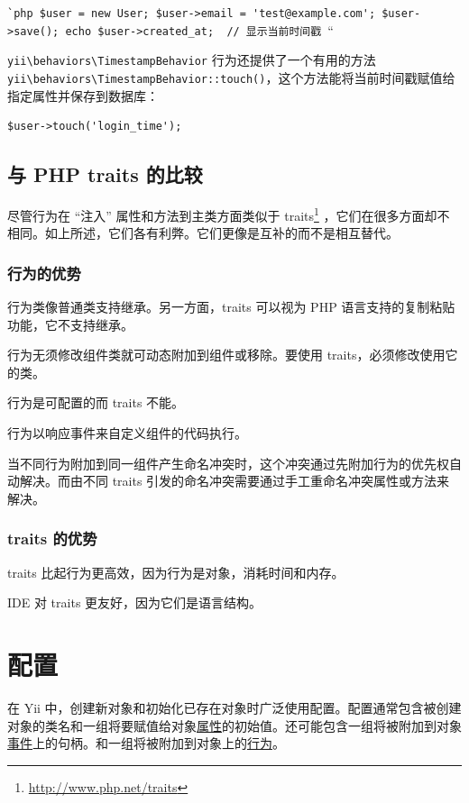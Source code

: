 \lstinline|`php $user = new User; $user->email = 'test@example.com'; $user->save(); echo $user->created_at;  // 显示当前时间戳 |``

\texttt{yii{\allowbreak{}\textbackslash}behaviors{\allowbreak{}\textbackslash}TimestampBehavior} 行为还提供了一个有用的方法 \texttt{yii{\allowbreak{}\textbackslash}behaviors{\allowbreak{}\textbackslash}TimestampBehavior\allowbreak{}::\allowbreak{}touch()}，这个方法能将当前时间戳赋值给指定属性并保存到数据库：

\lstset{language=php}\begin{lstlisting}
$user->touch('login_time');
\end{lstlisting}
\subsection{与 PHP traits 的比较}
尽管行为在 ``注入'' 属性和方法到主类方面类似于 traits\footnote{\url{http://www.php.net/traits}} ，它们在很多方面却不相同。如上所述，它们各有利弊。它们更像是互补的而不是相互替代。

\subsubsection{行为的优势}
行为类像普通类支持继承。另一方面，traits 可以视为 PHP 语言支持的复制粘贴功能，它不支持继承。

行为无须修改组件类就可动态附加到组件或移除。要使用 traits，必须修改使用它的类。

行为是可配置的而 traits 不能。

行为以响应事件来自定义组件的代码执行。

当不同行为附加到同一组件产生命名冲突时，这个冲突通过先附加行为的优先权自动解决。而由不同 traits 引发的命名冲突需要通过手工重命名冲突属性或方法来解决。

\subsubsection{traits 的优势}
traits 比起行为更高效，因为行为是对象，消耗时间和内存。

IDE 对 traits 更友好，因为它们是语言结构。



\label{concept-configurations.md}\section{配置}
在 Yii 中，创建新对象和初始化已存在对象时广泛使用配置。配置通常包含被创建对象的类名和一组将要赋值给对象\hyperref[concept-properties.md]{属性}的初始值。还可能包含一组将被附加到对象\hyperref[concept-events.md]{事件}上的句柄。和一组将被附加到对象上的\hyperref[concept-behaviors.md]{行为}。

